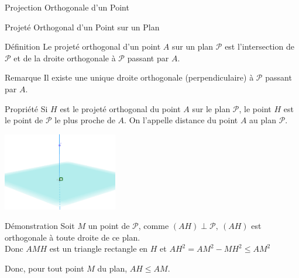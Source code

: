 \documentclass{coursbook}
\begin{document}
    \begin{Gpartie}{Projection Orthogonale d'un Point} 
        \begin{Spartie}{Projeté Orthogonal d'un Point sur un Plan} 
            \begin{SSSpartie}{Définition} 
                Le projeté orthogonal d'un point $A$ sur un plan $\mathcal{P}$ est l'intersection de $\mathcal{P}$ et de la droite orthogonale à $\mathcal{P}$ passant par $A$.
            \end{SSSpartie}
            \begin{SSSpartie}{Remarque} 
                Il existe une unique droite orthogonale (perpendiculaire) à $\mathcal{P}$ passant par $A$.
            \end{SSSpartie}
            \begin{SSSpartie}{Propriété} 
                Si $H$ est le projeté orthogonal du point $A$ sur le plan $\mathcal{P}$, le point $H$ est le point de $\mathcal{P}$ le plus proche de $A$. On l'appelle distance du point $A$ au plan $\mathcal{P}$.
                
                \begin{center}
                    \includegraphics[width=5cm]{rsc/12fig8.png}
                    \parbox{\linewidth}{}
                \end{center}

                \begin{SSSSpartie}{Démonstration} 
                    Soit $M$ un point de $\mathcal{P}$, comme $(AH)\perp\mathcal{P},~(AH)$ est orthogonale à toute droite de ce plan. \\ Donc $AMH$ est un triangle rectangle en $H$ et $AH^2=AM^2-MH^2\leq AM^2$

                    Donc, pour tout point $M$ du plan, $AH\leq AM$.


\end{SSSSpartie}
\end{SSSpartie}
\end{Spartie}
\end{Gpartie}
\end{document}
